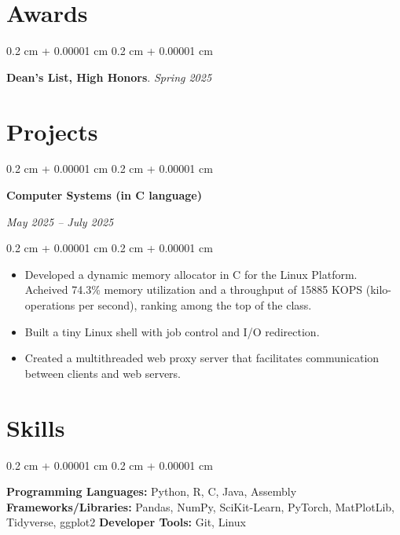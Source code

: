 \documentclass[10pt, letterpaper]{article}
\newenvironment{highlights}{
    \begin{itemize}[
        topsep=0.10 cm,
        parsep=0.10 cm,
        partopsep=0pt,
        itemsep=0pt,
        leftmargin=0.4 cm + 10pt
    ]
}{
    \end{itemize}
} %
\newenvironment{onecolentry}{
    \begin{adjustwidth}{
        0.2 cm + 0.00001 cm
    }{
        0.2 cm + 0.00001 cm
    }
}{
    \end{adjustwidth}
} %
\newenvironment{twocolentry}[2][]{
    \onecolentry
    \def\secondColumn{#2}
    \setcolumnwidth{\fill, 4.5 cm}
    \begin{paracol}{2}
}{
    \switchcolumn \raggedleft \secondColumn
    \end{paracol}
    \endonecolentry
} %
\begin{document}
    \section{Awards}
        \begin{onecolentry}
            \textbf{Dean's List, High Honors}. \emph{Spring 2025}
        \end{onecolentry}
    \section{Projects}
        \begin{twocolentry}{
        \textit{May 2025 – July 2025}}
            \textbf{Computer Systems (in C language)}
        \end{twocolentry}

        \vspace{0.10 cm}
        \begin{onecolentry}
            \begin{highlights}
                \item Developed a dynamic memory allocator in C for the Linux Platform. Acheived 74.3\% memory utilization and a throughput of 15885 KOPS (kilo-operations per second), ranking among the top of the class.
                \item Built a tiny Linux shell with job control and I/O redirection.
                \item Created a multithreaded web proxy server that facilitates communication between clients and web servers.
            \end{highlights}
        \end{onecolentry}
    \section{Skills}
        \begin{onecolentry}
            \textbf{Programming Languages:} Python, R, C, Java, Assembly \newline
            \textbf{Frameworks/Libraries:} Pandas, NumPy, SciKit-Learn, PyTorch, MatPlotLib, Tidyverse, ggplot2 \newline
            \textbf{Developer Tools:} Git, Linux

        \end{onecolentry}


    \vspace{0.20 cm}

    

    
\end{document}
